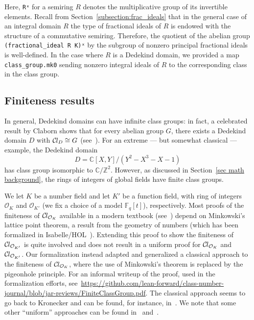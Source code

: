 \documentclass[sn-mathphys]{sn-jnl}%
\renewcommand{\C}{\mathbb{C}}
\newcommand{\lean}[1]{\texttt{#1}\xspace}
\newcommand*{\OK}[1][K]{\mathcal{O}_{#1}}
\newcommand*{\Cl}{\mathcal{C}\kern-.075em l}
\newcommand*{\Fq}[1][q]{\mathbb{F}_{#1}}
\renewcommand{\Z}{\mathbb{Z}}
\begin{document}
Here, \lean{Rˣ} for a semiring $R$ denotes the multiplicative group of its invertible elements.
Recall from Section~\ref{subsection:frac_ideals} that in the general case of an integral domain $R$ %
 the type of fractional ideals of $R$ is endowed with the structure of a commutative semiring.
Therefore, the quotient of the abelian group \lean{(fractional\_ideal R K)ˣ} by the subgroup of nonzero principal fractional ideals is well-defined.
In the case where $R$ is a Dedekind domain, we provided a map \lean{class\_group.mk0} sending nonzero integral ideals of $R$ to the corresponding class in the class group.

\subsection{Finiteness results}\label{subsec:finiteness}

In general, Dedekind domains can have infinite class groups: in fact, a celebrated result by Claborn shows that for every abelian group $G$, there exists a Dedekind domain $D$ with $\Cl_D\cong G$ (see~\cite[Theorem~7]{Cla66}). For an extreme --- but somewhat classical --- example, the Dedekind domain
\[
D=\C[X,Y]/(Y^2-X^3-X-1)  
\]
has class group isomorphic to $\C/\Z^2$. However, as discussed in Section~\ref{sec math background}, the rings of integers of global fields have finite class groups.

We let $K$ be a number field and let $K'$ be a function field, with ring of integers $\OK$ and $\OK[K']$ (we fix a choice of a model $\Fq[q][t]$), respectively. 
Most proofs of the finiteness of $\Cl_{\OK}$ available in a modern textbook (see~\cite[Theorems 4.4,~5.3,~6.3]{Neukirch}) depend on Minkowski's lattice point theorem, a result from the geometry of numbers (which has been formalized in Isabelle/HOL~\cite{Minkowskis_Theorem-AFP}).
Extending this proof to show the finiteness of $\Cl_{\OK[K']}$ is quite involved and does not result in a uniform proof for $\Cl_{\OK}$ and $\Cl_{\OK[K']}$.
Our formalization instead adapted and generalized a classical approach to the finiteness of $\Cl_{\OK}$, where the use of Minkowski's theorem is replaced by the pigeonhole principle. 
For an informal writeup of the proof, used in the formalization efforts, see~\url{https://github.com/lean-forward/class-number-journal/blob/jar-reviews/FiniteClassGroup.pdf}.
The classical approach seems to go back to Kronecker
and can be found, for instance, in~\cite{Ireland-Rosen}.
We note that some other ``uniform'' approaches can be found in~\cite{Artin-Whaples} and~\cite{Stasinski}.
\end{document}
